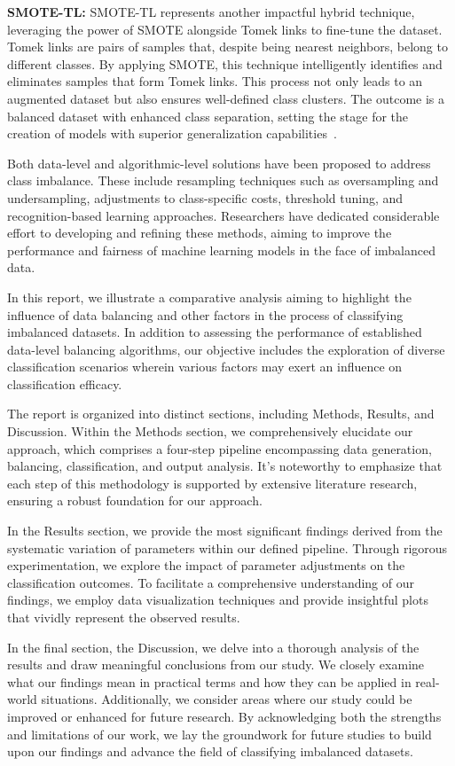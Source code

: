 \textbf{SMOTE-TL:} SMOTE-TL represents another impactful hybrid technique, leveraging the power of SMOTE alongside Tomek links to fine-tune the dataset. Tomek links are pairs of samples that, despite being nearest neighbors, belong to different classes. By applying SMOTE, this technique intelligently identifies and eliminates samples that form Tomek links. This process not only leads to an augmented dataset but also ensures well-defined class clusters. The outcome is a balanced dataset with enhanced class separation, setting the stage for the creation of models with superior generalization capabilities~\cite{Fotouhi2019,Xu2020,Khushi2021}.

Both data-level and algorithmic-level solutions have been proposed to address class imbalance.
These include resampling techniques such as oversampling and undersampling, adjustments to class-specific costs, threshold tuning, and recognition-based learning approaches. Researchers have dedicated considerable effort to developing and refining these methods, aiming to improve the performance and fairness of machine learning models in the face of imbalanced data.

In this report, we illustrate a comparative analysis aiming to highlight the influence of data balancing and other factors in the process of classifying imbalanced datasets. In addition to assessing the performance of established data-level balancing algorithms, our objective includes the exploration of diverse classification scenarios wherein various factors may exert an influence on classification efficacy.

The report is organized into distinct sections, including Methods, Results, and Discussion. Within the Methods section, we comprehensively elucidate our approach, which comprises a four-step pipeline encompassing data generation, balancing, classification, and output analysis. It’s noteworthy to emphasize that each step of this methodology is supported by extensive literature research, ensuring a robust foundation for our approach.

In the Results section, we provide the most significant findings derived from the systematic variation of parameters within our defined pipeline. Through rigorous experimentation, we explore the impact of parameter adjustments on the classification outcomes. To facilitate a comprehensive understanding of our findings, we employ data visualization techniques and provide insightful plots that vividly represent the observed results.

In the final section, the Discussion, we delve into a thorough analysis of the results and draw meaningful conclusions from our study. We closely examine what our findings mean in practical terms and how they can be applied in real-world situations. Additionally, we consider areas where our study could be improved or enhanced for future research. By acknowledging both the strengths and limitations of our work, we lay the groundwork for future studies to build upon our findings and advance the field of classifying imbalanced datasets. 



 
